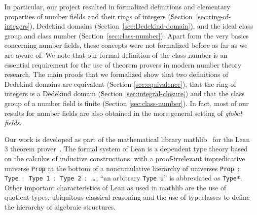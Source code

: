 \documentclass[a4paper,USenglish,cleveref, autoref, thm-restate]{lipics-v2021}
\newcommand{\lean}[1]{\texttt{#1}\xspace} %
\newcommand*{\Fq}[1][q]{\mathbb{F}_{#1}}
\newcommand{\mathlib}{\textsf{mathlib}\xspace}
\newcommand{\Z}{\mathbb{Z}}
\begin{document}
In particular, our project resulted in formalized definitions and elementary properties of
number fields and their rings of integers (Section~\ref{sec:ring-of-integers}),
Dedekind domains (Section~\ref{sec:Dedekind-domain}),
and the ideal class group and class number (Section~\ref{sec:class-number}).
Apart form the very basics concerning number fields, these concepts were not formalized before as far as we are aware of.
We note that our formal definition of the class number is an essential requirement for the use of theorem provers in modern number theory research.
%
The main proofs that we formalized show
that two definitions of Dedekind domains are equivalent (Section \ref{sec:equivalence}),
that the ring of integers %
is a Dedekind domain (Section \ref{sec:integral-closure})
and that the class group of a number field is finite (Section \ref{sec:class-number}).
In fact, most of our results for number fields are also obtained in the more general setting of \emph{global fields}.

%
%
%

Our work is developed as part of the mathematical library \mathlib~\cite{mathlib} for the Lean 3 theorem prover~\cite{lean-prover}.
The formal system of Lean is a dependent type theory based on the calculus of inductive constructions,
with a proof-irrelevant impredicative universe \lean{Prop} at the bottom of a noncumulative hierarchy of universes \lean{Prop $:$ Type $:$ Type 1 $:$ \mbox{Type 2} $:$ \dots}\,; ``an arbitrary \lean{Type u}'' is abbreviated as \lean{Type*}.
Other important characteristics of Lean as used in \mathlib are the use of quotient types, ubiquitous classical reasoning and the use of typeclasses to define the hierarchy of algebraic structures.
\end{document}
